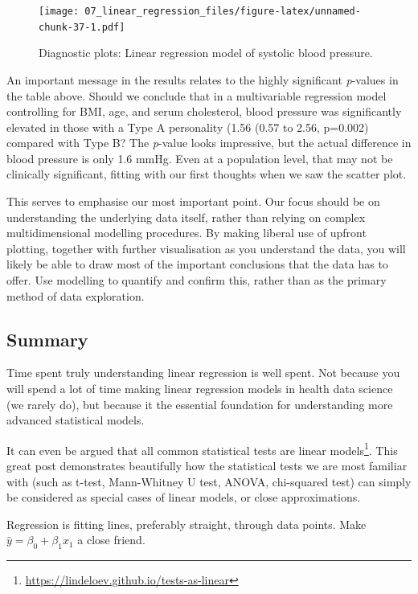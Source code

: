 \documentclass[
  12pt,
  krantz2]{krantz}
\renewcommand{\href}[2]{#2\footnote{\url{#1}}}
\begin{document}
\begin{figure}
\centering
\texttt{[image: 07\_linear\_regression\_files/figure-latex/unnamed-chunk-37-1.pdf]}
\caption{\label{fig:unnamed-chunk-37}Diagnostic plots: Linear regression model of systolic blood pressure.}
\end{figure}

An important message in the results relates to the highly significant \emph{p}-values in the table above.
Should we conclude that in a multivariable regression model controlling for BMI, age, and serum cholesterol, blood pressure was significantly elevated in those with a Type A personality (1.56 (0.57 to 2.56, p=0.002) compared with Type B?
The \emph{p}-value looks impressive, but the actual difference in blood pressure is only 1.6 mmHg.
Even at a population level, that may not be clinically significant, fitting with our first thoughts when we saw the scatter plot.

This serves to emphasise our most important point.
Our focus should be on understanding the underlying data itself, rather than relying on complex multidimensional modelling procedures.
By making liberal use of upfront plotting, together with further visualisation as you understand the data, you will likely be able to draw most of the important conclusions that the data has to offer.
Use modelling to quantify and confirm this, rather than as the primary method of data exploration.

\hypertarget{summary-1}{%
\subsection{Summary}\label{summary-1}}

Time spent truly understanding linear regression is well spent.
Not because you will spend a lot of time making linear regression models in health data science (we rarely do), but because it the essential foundation for understanding more advanced statistical models.

It can even be argued that all \href{https://lindeloev.github.io/tests-as-linear}{common statistical tests are linear models}.
This great post demonstrates beautifully how the statistical tests we are most familiar with (such as t-test, Mann-Whitney U test, ANOVA, chi-squared test) can simply be considered as special cases of linear models, or close approximations.

Regression is fitting lines, preferably straight, through data points.
Make \(\hat{y} = \beta_0 + \beta_1 x_1\) a close friend.
\end{document}
